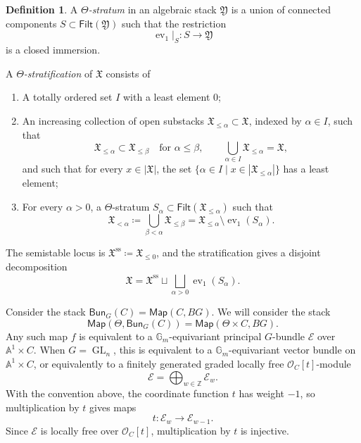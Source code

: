 \documentclass{amsart}
\theoremstyle{definition}
\newtheorem{defn}[thm]{Definition}
\theoremstyle{remark}
\theoremstyle{plain}
\theoremstyle{definition}
\theoremstyle{remark}
\newcommand{\A}{\mathbb{A}}
\newcommand{\G}{\mathbb{G}}
\newcommand{\Z}{\mathbb{Z}}
\newcommand{\mc}[1]{\mathcal{#1}}
\newcommand{\mf}[1]{\mathfrak{#1}}
\newcommand{\mr}[1]{\mathrm{#1}}
\newcommand{\on}[1]{\operatorname{#1}}
\newcommand{\ms}[1]{\mathsf{#1}}
\newcommand{\1}{\mathbf{1}}
\newcommand{\2}{\mathbf{2}}
\newcommand{\3}{\mathbf{3}}
\DeclareMathOperator{\ev}{ev}
\begin{document}
\begin{defn}
    A \textit{\(\Theta\)-stratum} in an algebraic stack \(\mf{Y}\) is a union of connected components \(S\subset\ms{Filt}(\mf{Y})\) such that the restriction
    \[
        \ev_1|_S\colon S\longrightarrow\mf{Y}
    \]
    is a closed immersion.

    A \textit{\(\Theta\)-stratification} of \(\mf{X}\) consists of
    \begin{enumerate}
        \item A totally ordered set \(I\) with a least element \(0\);
        \item An increasing collection of open substacks \(\mf{X}_{\leq\alpha}\subset\mf{X}\), indexed by \(\alpha\in I\), such that
        \[
            \mf{X}_{\leq\alpha}\subset\mf{X}_{\leq\beta}
            \quad\text{for }\alpha\leq\beta,
            \qquad
            \bigcup_{\alpha\in I}\mf{X}_{\leq\alpha}=\mf{X},
        \]
        and such that for every \(x\in|\mf{X}|\), the set \(\{\alpha\in I\mid x\in|\mf{X}_{\leq\alpha}|\}\) has a least element;
        \item For every \(\alpha>0\), a \(\Theta\)-stratum \(S_\alpha\subset\ms{Filt}(\mf{X}_{\leq\alpha})\) such that
        \[
            \mf{X}_{<\alpha}
            \coloneqq
            \bigcup_{\beta<\alpha}\mf{X}_{\leq\beta}
            =
            \mf{X}_{\leq\alpha}\setminus\ev_1(S_\alpha).
        \]
    \end{enumerate}
    The semistable locus is \(\mf{X}^{\mr{ss}}\coloneqq\mf{X}_{\leq0}\), and the stratification gives a disjoint decomposition
    \[
        \mf{X}
        =
        \mf{X}^{\mr{ss}}
        \sqcup
        \bigsqcup_{\alpha>0}\ev_1(S_\alpha).
    \]
\end{defn}

Consider the stack \(\ms{Bun}_G(C) = \ms{Map}(C, BG)\). We will consider the stack
\[ \ms{Map}(\Theta, \ms{Bun}_G(C)) = \ms{Map}(\Theta \times C, BG). \]
Any such map \(f\) is equivalent to a \(\G_m\)-equivariant principal \(G\)-bundle \(\mc{E}\) over \(\A^1\times C\). When \(G=\on{GL}_n\), this is equivalent to a \(\G_m\)-equivariant vector bundle on \(\A^1\times C\), or equivalently to a finitely generated graded locally free \(\mc{O}_C[t]\)-module
\[
    \mc{E}=\bigoplus_{w\in\Z}\mc{E}_w.
\]
With the convention above, the coordinate function \(t\) has weight \(-1\), so multiplication by \(t\) gives maps
\[
    t\colon\mc{E}_w\longrightarrow\mc{E}_{w-1}.
\]
Since \(\mc{E}\) is locally free over \(\mc{O}_C[t]\), multiplication by \(t\) is injective.
\end{document}
